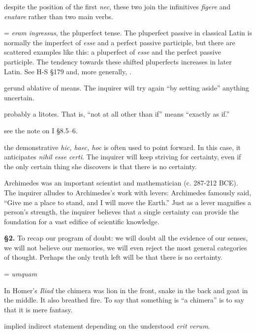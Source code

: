  despite the position of the first \textit{nec}, these two join the infinitives \textit{figere} and \textit{enatare} rather than two main verbs.

 = \textit{eram ingressus}, the pluperfect tense. The pluperfect passive in classical Latin is normally the imperfect of \textit{esse} and a perfect passive participle, but there are scattered examples like this: a pluperfect of \textit{esse} and the perfect passive participle. The tendency towards these shifted pluperfects increases in later Latin. See H-S §179 and, more generally, \cite[§298]{väänänen1981}.

 gerund ablative of means. The inquirer will try again ``by setting aside'' anything uncertain.

 probably a litotes. That is, ``not at all other than if'' means ``exactly as if.''

 see the note on I §8.5--6.

 the demonstrative \textit{hic, haec, hoc} is often used to point forward. In this case, it anticipates \textit{nihil esse certi}. The inquirer will keep striving for certainty, even if the only certain thing she discovers is that there is no certainty.

 Archimedes was an important scientist and mathematician (c. 287-212 BCE). The inquirer alludes to Archimedes's work with levers: Archimedes famously said, ``Give me a place to stand, and I will move the Earth.'' Just as a lever magnifies a person's strength, the inquirer believes that a single certainty can provide the foundation for a vast edifice of scientific knowledge.

\textbf{§2.} To recap our program of doubt: we will doubt all the evidence of our senses, we will not believe our memories, we will even reject the most general categories of thought. Perhaps the only truth left will be that there is no certainty.

 = \textit{umquam}

 In Homer's \textit{Iliad} the chimera was lion in the front, snake in the back and goat in the middle. It also breathed fire. To say that something is ``a chimera'' is to say that it is mere fantasy.

 implied indirect statement depending on the understood \textit{erit verum}.

